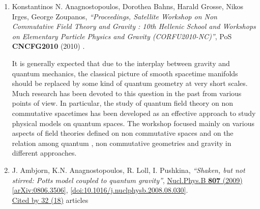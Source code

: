 \documentclass[a4paper,10pt]{article}
\begin{document}
\begin{enumerate}
\item Konstantinos N. Anagnostopoulos, Dorothea Bahns, Harald Grosse, Nikos Irges, George Zoupanos, {\it ``Proceedings, Satellite Workshop on Non Commutative Field Theory and Gravity : 10th Hellenic School and Workshops on Elementary Particle Physics and Gravity (CORFU2010-NC)''}, PoS {\bf CNCFG2010} (2010) .

It is generally expected that due to the interplay between gravity and quantum mechanics, the classical picture of smooth spacetime manifolds should be replaced by some kind of quantum geometry at very short scales. Much research has been devoted to this question in the past from various points of view. In particular, the study of quantum field theory on non commutative spacetimes has been developed as an effective approach to study physical models on quantum spaces. The workshop focused mainly on various aspects of field theories defined on non commutative spaces and on the relation among quantum , non commutative geometries and gravity in different approaches.
\item J. Ambjorn, K.N. Anagnostopoulos, R. Loll, I. Pushkina, {\it ``Shaken, but not stirred: Potts model coupled to quantum gravity''}, \href{https://www.doi.org/10.1016/j.nuclphysb.2008.08.030}{Nucl.Phys.B {\bf 807} (2009) } \href{https://arxiv.org/abs/0806.3506}{[arXiv:0806.3506]}, \href{https://www.doi.org/10.1016/j.nuclphysb.2008.08.030}{[doi:10.1016/j.nuclphysb.2008.08.030]}.
\\\href{https://inspirehep.net/literature/?q=refersto%3Arecid%3A788863}{Cited by 32 (18)} articles


\end{enumerate}
\end{document}
